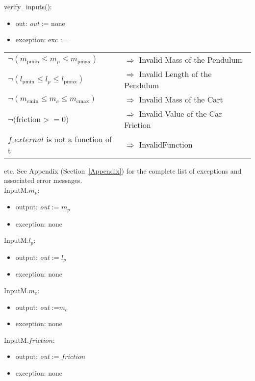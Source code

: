 \documentclass[12pt, titlepage]{article}
\begin{document}
\noindent verify\_inputs():
\begin{itemize}
\item out: \textit{out} := none
\item exception: exc := 
\end{itemize}

\noindent \begin{longtable*}[l]{l l} 
$\neg (m_{\text{pmin}} \leq m_p \leq m_{\text{pmax}})$ & $\Rightarrow$ Invalid Mass of the Pendulum\\

$\neg (l_{\text{pmin}} \leq l_p \leq l_{\text{pmax}})$& $\Rightarrow$  Invalid Length of the Pendulum\\
$\neg (m_{\text{cmin}} \leq m_c\leq m_{\text{cmax}})$ & $\Rightarrow$  Invalid Mass of the Cart \\
$\neg ($friction$ >= 0)$ & $\Rightarrow$ Invalid Value of the Car Friction\\
$f\_external$ is not a function of t & $\Rightarrow$ InvalidFunction\\
\end{longtable*}
etc.  See Appendix (Section~\ref{Appendix}) for the complete list of exceptions and associated error messages.\\
\newline
\noindent InputM.$m_p$:
\begin{itemize}
\item output: \textit{out} := $m_p$
\item exception: none
\end{itemize}

\noindent InputM.$l_p$:
\begin{itemize}
\item output: \textit{out} := $l_p$
\item exception: none
\end{itemize}

\noindent InputM.$m_c$:
\begin{itemize}
\item output: \textit{out} :=$m_c$
\item exception: none
\end{itemize}

\noindent InputM.$friction$:
\begin{itemize}
\item output: \textit{out} := $friction$
\item exception: none
\end{itemize}\noindent 
\end{document}
